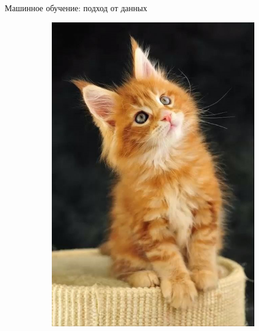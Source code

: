 \documentclass[aspectratio=169]{beamer}
\begin{document}
\begin{frame}{Машинное обучение: подход от данных}
\begin{figure}
\begin{subfigure}[b]{.1\linewidth}
            \includegraphics[width=\linewidth]{graphs/fig14_5.jpg}
        \end{subfigure}
        \begin{subfigure}[b]{.1\linewidth}

\end{subfigure}
\end{figure}
\end{frame}
\end{document}
